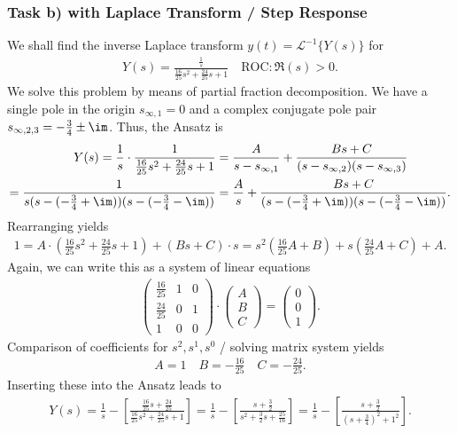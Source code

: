 \subsubsection{Task b) with Laplace Transform / Step Response}
We shall find the inverse Laplace transform $y(t) = \mathcal{L}^{-1}\{Y(s)\}$
for
\begin{align}
Y(s) = \frac{\frac{1}{s}}{\frac{16}{25} s^2 + \frac{24}{25} s + 1}
\quad \text{ROC}: \Re(s) > 0.
\end{align}
%
We solve this problem by means of partial fraction decomposition.
We have a single pole in the origin $s_{\infty,1}=0$ and a complex conjugate
pole pair $s_{\infty,2,3}=-\frac{3}{4}\pm \im$.
Thus, the Ansatz is
\begin{align}
Y(s) = \frac{1}{s}
\cdot \frac{1}{\frac{16}{25} s^2 + \frac{24}{25} s + 1} &=
\frac{A}{s-s_{\infty,1}} + \frac{Bs+C}{(s-s_{\infty,2})(s-s_{\infty,3})} \\ \nonumber
=\frac{1}{s(s-(-\frac{3}{4}+\im))(s-(-\frac{3}{4}-\im))}&=\frac{A}{s}+\frac{Bs+C}{(s-(-\frac{3}{4}+\im))(s-(-\frac{3}{4}-\im))}
.
\end{align}
Rearranging yields
\begin{align}
1 =
A \cdot (\frac{16}{25} s^2 + \frac{24}{25} s + 1) +
(B s + C) \cdot s=s^2(\frac{16}{25}A+B)+s(\frac{24}{25}A+C)+A.
\end{align}
Again, we can write this as a system of linear equations
\begin{align}
	\begin{pmatrix}
		\frac{16}{25} & 1 & 0 \\
		\frac{24}{25} & 0 & 1 \\
		1 & 0 & 0
	\end{pmatrix}
	\cdot
	\begin{pmatrix}
		A \\
		B \\
		C
	\end{pmatrix}
	=
	\begin{pmatrix}
		0 \\
		0 \\
		1
	\end{pmatrix}.
\end{align}
Comparison of coefficients for $s^2, s^1, s^0$ / solving matrix system yields
\begin{align}
  A = 1\quad B = -\frac{16}{25} \quad C = -\frac{24}{25}.
\end{align}
Inserting these into the Ansatz leads to
\begin{align}
Y(s) =
\frac{1}{s} - \left[\frac{\frac{16}{25} s + \frac{24}{25}}{\frac{16}{25} s^2 + \frac{24}{25} s + 1}\right]=
\frac{1}{s} - \left[\frac{s + \frac{3}{2}}{s^2 + \frac{3}{2} s + \frac{25}{16}}\right]=
\frac{1}{s} - \left[\frac{s + \frac{3}{2}}{(s + \frac{3}{4})^2 + 1^2}\right].
\end{align}
